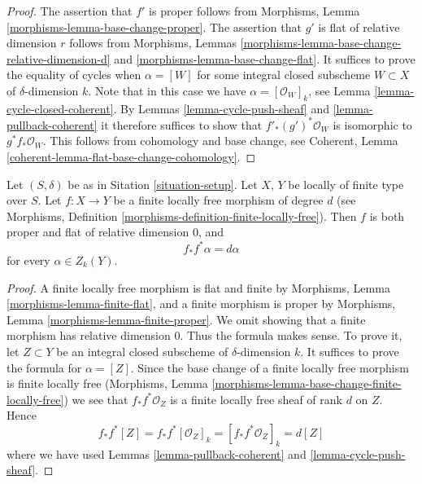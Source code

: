 \begin{proof}
The assertion that $f'$ is proper follows from
Morphisms, Lemma \ref{morphisms-lemma-base-change-proper}.
The assertion that $g'$ is flat of relative dimension $r$ follows from
Morphisms, Lemmas \ref{morphisms-lemma-base-change-relative-dimension-d}
and \ref{morphisms-lemma-base-change-flat}.
It suffices to prove the equality of cycles when $\alpha = [W]$
for some integral closed subscheme $W \subset X$ of $\delta$-dimension $k$.
Note that in this case we have $\alpha = [\mathcal{O}_W]_k$, see
Lemma \ref{lemma-cycle-closed-coherent}.
By Lemmas \ref{lemma-cycle-push-sheaf} and
\ref{lemma-pullback-coherent} it therefore suffices
to show that $f'_*(g')^*\mathcal{O}_W$ is isomorphic to
$g^*f_*\mathcal{O}_W$. This follows from cohomology and
base change, see
Coherent, Lemma \ref{coherent-lemma-flat-base-change-cohomology}.
\end{proof}

\begin{lemma}
\label{lemma-finite-flat}
Let $(S, \delta)$ be as in Sitation \ref{situation-setup}.
Let $X$, $Y$ be locally of finite type over $S$.
Let $f : X \to Y$ be a finite locally free morphism
of degree $d$ (see
Morphisms, Definition \ref{morphisms-definition-finite-locally-free}).
Then $f$ is both proper and flat of relative dimension $0$, and
$$
f_*f^*\alpha = d\alpha
$$
for every $\alpha \in Z_k(Y)$.
\end{lemma}

\begin{proof}
A finite locally free morphism is flat and finite by
Morphisms, Lemma \ref{morphisms-lemma-finite-flat},
and a finite morphism is proper
by Morphisms, Lemma \ref{morphisms-lemma-finite-proper}.
We omit showing that a finite
morphism has relative dimension $0$. Thus the formula makes sense.
To prove it, let $Z \subset Y$ be an integral closed subscheme
of $\delta$-dimension $k$. It suffices to prove the formula
for $\alpha = [Z]$. Since the base change of a finite locally free
morphism is finite locally free
(Morphisms, Lemma \ref{morphisms-lemma-base-change-finite-locally-free})
we see that $f_*f^*\mathcal{O}_Z$ is a finite locally free sheaf of
rank $d$ on $Z$. Hence
$$
f_*f^*[Z] = f_*f^*[\mathcal{O}_Z]_k =
[f_*f^*\mathcal{O}_Z]_k = d[Z]
$$
where we have used Lemmas \ref{lemma-pullback-coherent} and
\ref{lemma-cycle-push-sheaf}.
\end{proof}








